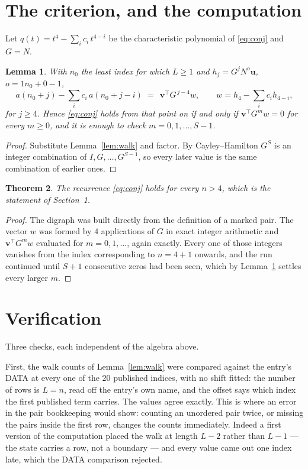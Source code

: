 \documentclass[11pt,a4paper]{article}
\theoremstyle{plain}
\newtheorem{theorem}{Theorem}
\newtheorem{lemma}[theorem]{Lemma}
\theoremstyle{definition}
\begin{document}
\section{The criterion, and the computation}

Let $q(t)=t^{4}-\sum_i c_i\,t^{4-i}$ be the characteristic polynomial of
\eqref{eq:conj} and $G=N$.

\begin{lemma}\label{lem:crit}
With $n_0$ the least index for which $L\ge1$ and $h_j=G^{j}N^{o}\mathbf{u}$,
$o=1n_0+0-1$,
\[
a(n_0+j)-\sum_i c_i\,a(n_0+j-i)\;=\;\,\mathbf{v}^{\!\top}G^{\,j-4}w,
\qquad w=h_{4}-\sum_i c_i h_{4-i},
\]
for $j\ge4$. Hence \eqref{eq:conj} holds from that point on if and only if
$\mathbf{v}^{\!\top}G^{m}w=0$ for every $m\ge0$, and it is enough to check
$m=0,1,\dots,S-1$.
\end{lemma}

\begin{proof}
Substitute Lemma~\ref{lem:walk} and factor. By Cayley--Hamilton $G^{S}$ is an integer
combination of $I,G,\dots,G^{S-1}$, so every later value is the same combination of earlier
ones.
\end{proof}

\begin{theorem}
The recurrence \eqref{eq:conj} holds for every $n>4$, which is the statement of
Section~1.
\end{theorem}

\begin{proof}
The digraph was built directly from the definition of a marked pair. The vector $w$ was
formed by $4$ applications of $G$ in exact integer arithmetic and
$\mathbf{v}^{\!\top}G^{m}w$ evaluated for $m=0,1,\dots$, again exactly. Every one of
those integers vanishes from the index corresponding to $n=4+1$ onwards, and the run
continued until $S+1$ consecutive zeros had been seen, which by Lemma~\ref{lem:crit}
settles every larger $m$.
\end{proof}

\section{Verification}

Three checks, each independent of the algebra above.

First, the walk counts of Lemma~\ref{lem:walk} were compared against the entry's DATA at
every one of the $20$ published indices, with no shift fitted: the number of rows is
$L=n$, read off the entry's own name, and the offset says which index the first
published term carries. The values agree exactly. This is where an error in the pair
bookkeeping would show: counting an unordered pair twice, or missing the pairs inside the
first row, changes the counts immediately. Indeed a first version of the computation
placed the walk at length $L-2$ rather than $L-1$ --- the state carries a row, not a
boundary --- and every value came out one index late, which the DATA comparison rejected.
\end{document}
